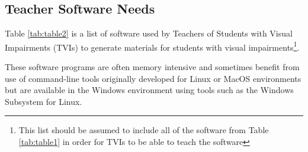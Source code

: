 \documentclass[14pt,letterpaper,twoside]{extreport}
\begin{document}
\pagebreak \hypertarget{teacher-software-needs}{}\subsection{Teacher Software Needs}\label{teacher-software-needs}
Table \ref{tab:table2} is a list of software used by Teachers of Students with Visual Impairments (TVIs) to generate materials for students with visual impairments\footnote{This list should be assumed to include all of the software from Table \ref{tab:table1} in order for TVIs to be able to teach the software}.

These software programs are often memory intensive and sometimes benefit from use of command-line tools originally developed for Linux or MacOS environments but are available in the Windows environment using tools such as the Windows Subsystem for Linux.
\end{document}
